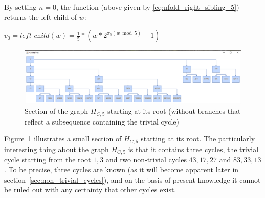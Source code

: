 \par\medskip
\noindent
By setting $n=0$, the function (above given by \ref{eq:nfold_right_sibling_5}) returns the left child of $w$:
\begin{center}
	$v_0=\textit{left-child}(w)=\frac{1}{5}*\left(w*2^{\pi_5(w\bmod 5)}-1\right)$
\end{center}

\begin{figure}
	\includegraphics[width=1.00\textwidth]{figures/h_c5b.png}
	\caption{Section of the graph $H_{C,5}$ starting at its root (without branches that reflect a subsequence containing the trivial cycle)}
	\label{fig:4}
\end{figure}

Figure~\ref{fig:4} illustrates a small section of $H_{C,5}$ starting at its root. The particularly interesting thing about the graph $H_{C,5}$ is that it contains three cycles, the trivial cycle starting from the root $1,3$ and two non-trivial cycles $43,17,27$ and $83,33,13$. To be precise, three cycles are known (as it will become apparent later in section~\ref{sec:non_trivial_cycles}), and on the basis of present knowledge it cannot be ruled out with any certainty that other cycles exist.

